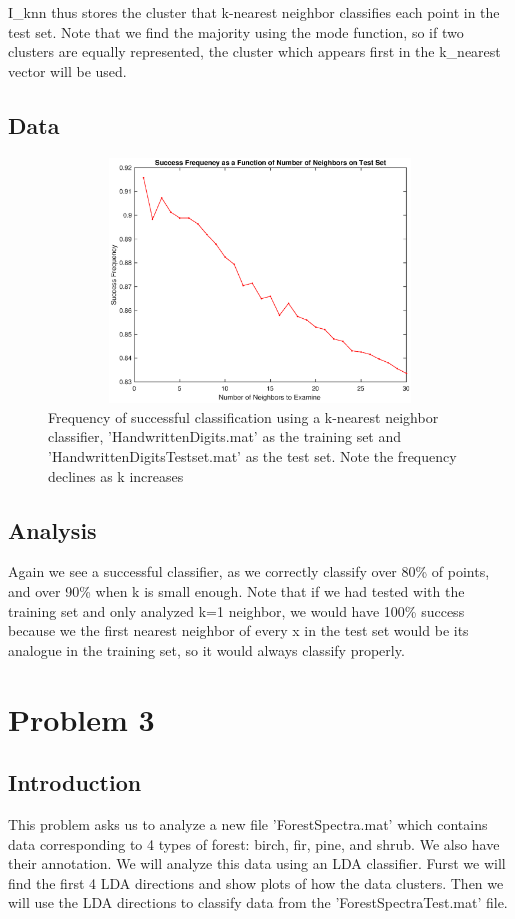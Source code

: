 \documentclass{article}
\begin{document}
I\_knn thus stores the cluster that k-nearest neighbor classifies each point in the test set. Note that we find the majority using the mode function, so if two clusters are equally represented, the cluster which appears first in the k\_nearest vector will be used. 

\subsection*{Data}
\begin{figure}[H]
    \centerline
    {
    \includegraphics[width=15cm, height=6.5cm]{Q2_plot}
    }
    \caption{\label{fig:my figure} Frequency of successful classification using a k-nearest neighbor classifier, 'HandwrittenDigits.mat' as the training set and 'HandwrittenDigitsTestset.mat' as the test set.  Note the frequency declines as k increases}
\end{figure}

\subsection*{Analysis}
Again we see a successful classifier, as we correctly classify over 80\% of points, and over 90\% when k is small enough.  Note that if we had tested with the training set and only analyzed k=1 neighbor, we would have 100\% success because we the first nearest neighbor of every x in the test set would be its analogue in the training set, so it would always classify properly.

\section*{Problem 3}
\subsection*{Introduction}
This problem asks us to analyze a new file 'ForestSpectra.mat' which contains data corresponding to 4 types of forest: birch, fir, pine, and shrub.   We also have their annotation.  We will analyze this data using an LDA classifier.  Furst we will find the first 4 LDA directions and show plots of how the data clusters.  Then we will use the LDA directions to classify data from the 'ForestSpectraTest.mat' file.  
\end{document}
